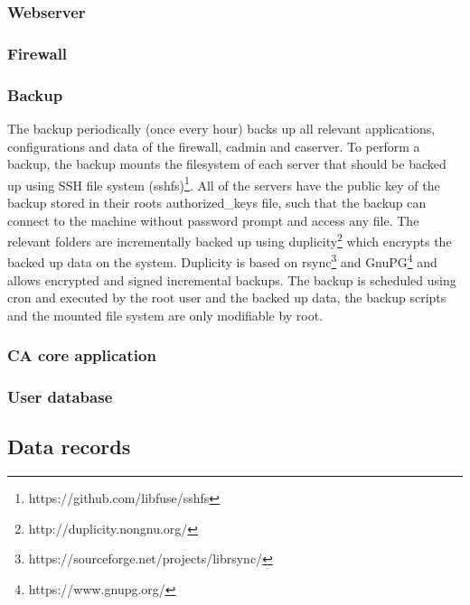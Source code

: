 \documentclass[english]{article}
\begin{document}
\subsubsection{Webserver}



\subsubsection{Firewall}



\subsubsection{Backup}

The backup periodically (once every hour) backs up all relevant applications, configurations and data of the firewall, cadmin and caserver. To perform a backup, the backup mounts the filesystem of each server that should be backed up using SSH file system (sshfs)\footnote{https://github.com/libfuse/sshfs}. All of the servers have the public key of the backup stored in their roots authorized\_keys file, such that the backup can connect to the machine without password prompt and access any file. The relevant folders are incrementally backed up using duplicity\footnote{http://duplicity.nongnu.org/} which encrypts the backed up data on the system. Duplicity is based on rsync\footnote{https://sourceforge.net/projects/librsync/} and GnuPG\footnote{https://www.gnupg.org/} and allows encrypted and signed incremental backups. The backup is scheduled using cron and executed by the root user and the backed up data, the backup scripts and the mounted file system are only modifiable by root.



\subsubsection{CA core application}



\subsubsection{User database}



\subsection{Data records}
\end{document}
